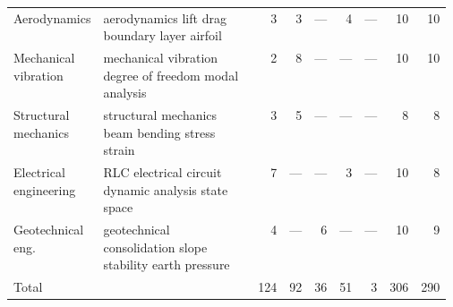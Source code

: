 \begin{footnotesize}
\begin{longtable}{@{}>{\raggedright\arraybackslash}p{0.17\linewidth}>{\raggedright\arraybackslash}p{0.40\linewidth}rrrrrrr@{}}
Aerodynamics & aerodynamics lift drag boundary layer airfoil & 3 & 3 & --- & 4 & --- & 10 & 10 \\
Mechanical vibration & mechanical vibration degree of freedom modal analysis & 2 & 8 & --- & --- & --- & 10 & 10 \\
Structural mechanics & structural mechanics beam bending stress strain & 3 & 5 & --- & --- & --- & 8 & 8 \\
Electrical engineering & RLC electrical circuit dynamic analysis state space & 7 & --- & --- & 3 & --- & 10 & 8 \\
Geotechnical eng. & geotechnical consolidation slope stability earth pressure & 4 & --- & 6 & --- & --- & 10 & 9 \\
\midrule
Total & & 124 & 92 & 36 & 51 & 3 & 306 & 290 \\
\end{longtable}
\end{footnotesize}
